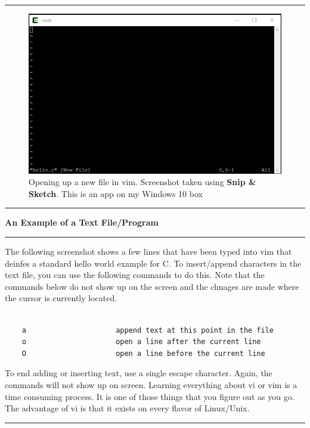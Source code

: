 \documentclass[10pt,fleqn]{article}
\begin{document}
\vskip0.1in\hrule\vskip0.1in
\vfill
\begin{figure}[h]
\centering
\includegraphics{../images/cygwin_06.png}
\caption{Opening up a new file in vim. Screenshot taken using
         {\bf Snip \& Sketch}. This is an app on my Windows 10 box}
\end{figure}
\eject
\vskip0.1in\hrule\vskip0.1in
\noindent
{\large{\bf An Example of a Text File/Program}}
\vskip0.1in\hrule\vskip0.1in
\noindent
The following screenshot shows a few lines that have been typed into vim that
deinfes a standard hello world example for C. To insert/append characters in the
text file, you can use the following commands to do this. Note that the commands
below do not show up on the screen and the chnages are made where the cursor is
currently located.
\begin{verbatim}

    a                     append text at this point in the file
    o                     open a line after the current line
    O                     open a line before the current line

\end{verbatim}
To end adding or inserting text, use a single escape character. Again, the
commands will not show up on screen. Learning everything about vi or vim is a
time consuming process. It is one of those things that you figure out as you go.
The advantage of vi is that it exists on every flavor of Linux/Unix.
\vskip0.1in\hrule\vskip0.1in
\vfill
\end{document}
